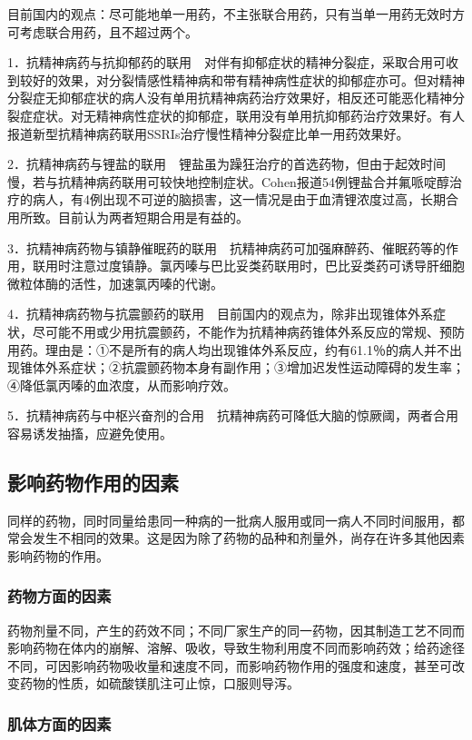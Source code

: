 目前国内的观点：尽可能地单一用药，不主张联合用药，只有当单一用药无效时方可考虑联合用药，且不超过两个。

1．抗精神病药与抗抑郁药的联用　对伴有抑郁症状的精神分裂症，采取合用可收到较好的效果，对分裂情感性精神病和带有精神病性症状的抑郁症亦可。但对精神分裂症无抑郁症状的病人没有单用抗精神病药治疗效果好，相反还可能恶化精神分裂症症状。对无精神病性症状的抑郁症，联用没有单用抗抑郁药治疗效果好。有人报道新型抗精神病药联用SSRIs治疗慢性精神分裂症比单一用药效果好。

2．抗精神病药与锂盐的联用　锂盐虽为躁狂治疗的首选药物，但由于起效时间慢，若与抗精神病药联用可较快地控制症状。Cohen报道54例锂盐合并氟哌啶醇治疗的病人，有4例出现不可逆的脑损害，这一情况是由于血清锂浓度过高，长期合用所致。目前认为两者短期合用是有益的。

3．抗精神病药物与镇静催眠药的联用　抗精神病药可加强麻醉药、催眠药等的作用，联用时注意过度镇静。氯丙嗪与巴比妥类药联用时，巴比妥类药可诱导肝细胞微粒体酶的活性，加速氯丙嗪的代谢。

4．抗精神病药物与抗震颤药的联用　目前国内的观点为，除非出现锥体外系症状，尽可能不用或少用抗震颤药，不能作为抗精神病药锥体外系反应的常规、预防用药。理由是：①不是所有的病人均出现锥体外系反应，约有61.1％的病人并不出现锥体外系症状；②抗震颤药物本身有副作用；③增加迟发性运动障碍的发生率；④降低氯丙嗪的血浓度，从而影响疗效。

5．抗精神病药与中枢兴奋剂的合用　抗精神病药可降低大脑的惊厥阈，两者合用容易诱发抽搐，应避免使用。

\subsection{影响药物作用的因素}

同样的药物，同时同量给患同一种病的一批病人服用或同一病人不同时间服用，都常会发生不相同的效果。这是因为除了药物的品种和剂量外，尚存在许多其他因素影响药物的作用。

\subsubsection{药物方面的因素}

药物剂量不同，产生的药效不同；不同厂家生产的同一药物，因其制造工艺不同而影响药物在体内的崩解、溶解、吸收，导致生物利用度不同而影响药效；给药途径不同，可因影响药物吸收量和速度不同，而影响药物作用的强度和速度，甚至可改变药物的性质，如硫酸镁肌注可止惊，口服则导泻。

\subsubsection{肌体方面的因素}

